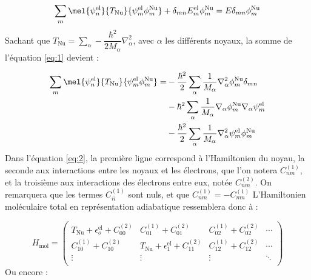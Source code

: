 \begin{equation}\label{eq:1}
    \sum\limits_m \mel{\psi^\text{el}_n}{T_\text{Nu}}{\psi^\text{el}_m \phi^\text{Nu}_m} + \delta_{mn}E^\text{el}_m\phi^\text{Nu}_m = E \delta_{mn}\phi^\text{Nu}_m
\end{equation}
Sachant que $T_\text{Nu} = \sum\limits_{\alpha}-\dfrac{\hbar^2}{2M_{\alpha}}\nabla_{\alpha}^2$, avec $\alpha$ les différents noyaux, la somme de l'équation \ref{eq:1} devient :

\begin{equation}\label{eq:2}
    \begin{split}
        \sum\limits_m \mel{\psi^\text{el}_n}{T_\text{Nu}}{\psi^\text{el}_m \phi^\text{Nu}_m} = & - \dfrac{\hbar^2}{2}\sum\limits_{\alpha}\dfrac{1}{M_{\alpha}}\nabla_{\alpha}^2\phi^\text{Nu}_m\delta_{mn} \\
        & - \hbar^2\sum\limits_{\alpha}\dfrac{1}{M_{\alpha}}\nabla_{\alpha}\phi^\text{Nu}_m\nabla_{\alpha}\psi^\text{el}_m \\
        & - \dfrac{\hbar^2}{2}\sum\limits_{\alpha}\dfrac{1}{M_{\alpha}}\nabla_{\alpha}^2\psi^\text{el}_m\phi^\text{Nu}_m
    \end{split}
\end{equation}
Dans l'équation \ref{eq:2}, la première ligne correspond à l'Hamiltonien du noyau, la seconde aux interactions entre les noyaux et les électrons, que l'on notera $C_{nm}^{(1)}$, et la troisième aux interactions des électrons entre eux, notée $C_{nm}^{(2)}$. On remarquera que les termes $C_{ii}^{(1)}$ sont nuls, et que $C_{nm}^{(1)} = - C_{mn}^{(1)}$
L'Hamiltonien moléculaire total en représentation adiabatique ressemblera donc à :

\[
    H_\text{mol} =
    \begin{pmatrix}
        T_\text{Nu} + \epsilon_o^\text{el} + C_{00}^{(2)} & C_{01}^{(1)}+C_{01}^{(2)} & C_{02}^{(1)}+C_{02}^{(2)} & \cdots \\
        C_{10}^{(1)}+C_{10}^{(2)} & T_\text{Nu} + \epsilon_1^\text{el} + C_{11}^{(2)} & C_{12}^{(1)}+C_{12}^{(2)} & \cdots \\
        \vdots  & \vdots  & \vdots & \ddots  \\
    \end{pmatrix}
\]
Ou encore :

